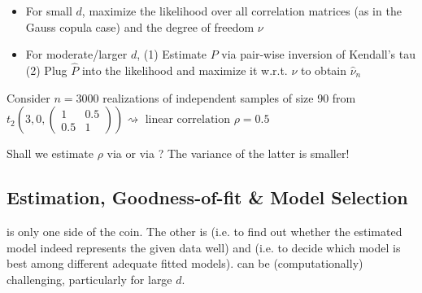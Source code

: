 \begin{itemize}[leftmargin=*]
    \item For small $d$, maximize the likelihood over all correlation matrices (as in the Gauss copula case) and the degree of freedom $\nu$
    \item For moderate/larger $d$,
(1) Estimate $P$ via pair-wise inversion of Kendall's tau
(2) Plug $\hat{P}$ into the likelihood and maximize it w.r.t. $\nu$ to obtain $\hat{\nu}_{n}$
\end{itemize}



Consider $n=3000$ realizations of independent samples of size 90 from
$
t_{2}\left(3,0,\left(\begin{array}{cc}
1 & 0.5 \\
0.5 & 1
\end{array}\right)\right) \rightsquigarrow \text { linear correlation } \rho=0.5
$

Shall we estimate $\rho$ via  or via ? The variance of the latter is smaller!




\subsection*{Estimation, Goodness-of-fit \& Model Selection}
 is only one side of the coin. The other is  (i.e. to find out whether the estimated model indeed represents the given data well) and  (i.e. to decide which model is best among different adequate fitted models).  can be (computationally) challenging, particularly for large $d$.